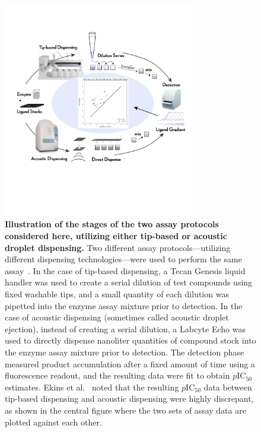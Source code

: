 \documentclass[aps,pre,twocolumn,nofootinbib,superscriptaddress,linenumbers]{revtex4-1}
\begin{document}
\begin{figure}[tb]
   \includegraphics[trim={0 15cm 0 8cm},clip,width=0.75\textwidth]{../figures/Fig1-4.pdf}
  \caption{{\bf Illustration of the stages of the two assay protocols considered here, utilizing either tip-based or acoustic droplet dispensing.}
  Two different assay protocols---utilizing different dispensing technologies---were used to perform the same assay~\cite{ekins_dispensing_2013,barlaam_novel_2009,barlaam_pyrimidine_2010}.
  In the case of tip-based dispensing, a Tecan Genesis liquid handler was used to create a serial dilution of test compounds using fixed washable tips, and a small quantity of each dilution was pipetted into the enzyme assay mixture prior to detection.
  In the case of acoustic dispensing (sometimes called acoustic droplet ejection), instead of creating a serial dilution, a Labcyte Echo was used to directly dispense nanoliter quantities of compound stock into the enzyme assay mixture prior to detection.
  The detection phase measured product accumulation after a fixed amount of time using a fluorescence readout, and the resulting data were fit to obtain $p$IC$_{50}$ estimates.
  Ekins et al.~\citep{ekins_dispensing_2013} noted that the resulting $p$IC$_{50}$ data between tip-based dispensing and acoustic dispensing were highly discrepant, as shown in the central figure where the two sets of assay data are plotted against each other.
   }
  \label{fig:overview}
\end{figure}


\end{document}
